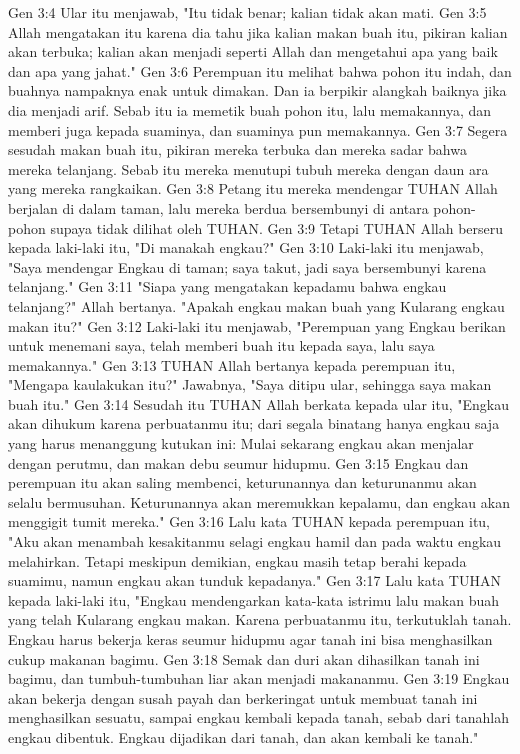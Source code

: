 Gen 3:4  Ular itu menjawab, "Itu tidak benar; kalian tidak akan mati.
Gen 3:5  Allah mengatakan itu karena dia tahu jika kalian makan buah itu, pikiran kalian akan terbuka; kalian akan menjadi seperti Allah dan mengetahui apa yang baik dan apa yang jahat."
Gen 3:6  Perempuan itu melihat bahwa pohon itu indah, dan buahnya nampaknya enak untuk dimakan. Dan ia berpikir alangkah baiknya jika dia menjadi arif. Sebab itu ia memetik buah pohon itu, lalu memakannya, dan memberi juga kepada suaminya, dan suaminya pun memakannya.
Gen 3:7  Segera sesudah makan buah itu, pikiran mereka terbuka dan mereka sadar bahwa mereka telanjang. Sebab itu mereka menutupi tubuh mereka dengan daun ara yang mereka rangkaikan.
Gen 3:8  Petang itu mereka mendengar TUHAN Allah berjalan di dalam taman, lalu mereka berdua bersembunyi di antara pohon-pohon supaya tidak dilihat oleh TUHAN.
Gen 3:9  Tetapi TUHAN Allah berseru kepada laki-laki itu, "Di manakah engkau?"
Gen 3:10  Laki-laki itu menjawab, "Saya mendengar Engkau di taman; saya takut, jadi saya bersembunyi karena telanjang."
Gen 3:11  "Siapa yang mengatakan kepadamu bahwa engkau telanjang?" Allah bertanya. "Apakah engkau makan buah yang Kularang engkau makan itu?"
Gen 3:12  Laki-laki itu menjawab, "Perempuan yang Engkau berikan untuk menemani saya, telah memberi buah itu kepada saya, lalu saya memakannya."
Gen 3:13  TUHAN Allah bertanya kepada perempuan itu, "Mengapa kaulakukan itu?" Jawabnya, "Saya ditipu ular, sehingga saya makan buah itu."
Gen 3:14  Sesudah itu TUHAN Allah berkata kepada ular itu, "Engkau akan dihukum karena perbuatanmu itu; dari segala binatang hanya engkau saja yang harus menanggung kutukan ini: Mulai sekarang engkau akan menjalar dengan perutmu, dan makan debu seumur hidupmu.
Gen 3:15  Engkau dan perempuan itu akan saling membenci, keturunannya dan keturunanmu akan selalu bermusuhan. Keturunannya akan meremukkan kepalamu, dan engkau akan menggigit tumit mereka."
Gen 3:16  Lalu kata TUHAN kepada perempuan itu, "Aku akan menambah kesakitanmu selagi engkau hamil dan pada waktu engkau melahirkan. Tetapi meskipun demikian, engkau masih tetap berahi kepada suamimu, namun engkau akan tunduk kepadanya."
Gen 3:17  Lalu kata TUHAN kepada laki-laki itu, "Engkau mendengarkan kata-kata istrimu lalu makan buah yang telah Kularang engkau makan. Karena perbuatanmu itu, terkutuklah tanah. Engkau harus bekerja keras seumur hidupmu agar tanah ini bisa menghasilkan cukup makanan bagimu.
Gen 3:18  Semak dan duri akan dihasilkan tanah ini bagimu, dan tumbuh-tumbuhan liar akan menjadi makananmu.
Gen 3:19  Engkau akan bekerja dengan susah payah dan berkeringat untuk membuat tanah ini menghasilkan sesuatu, sampai engkau kembali kepada tanah, sebab dari tanahlah engkau dibentuk. Engkau dijadikan dari tanah, dan akan kembali ke tanah."

